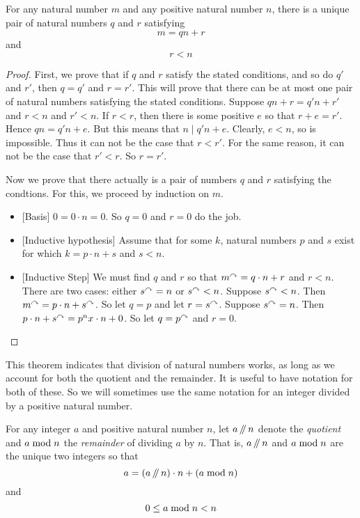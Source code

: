 \begin{thm}
	For any natural number $m$ and any positive natural number $n$, there is a unique pair of natural numbers $q$ and $r$ 
	satisfying
	\[m=qn + r\]
	and
	\[r < n\]
 
\begin{proof}
	First, we prove that if $q$ and $r$ satisfy the stated conditions, and so do $q'$ and $r'$, then $q=q'$ and $r=r'$.
	This will prove that there can be at most one pair of natural numbers satisfying the stated conditions.
	Suppose $qn+r = q'n+ r'$ and $r<n$ and $r'<n$. If $r<r$,
	then there is some positive $e$ so that $r+e=r'$. Hence $qn = q'n+e$. But this means that $n \mid q'n+e$. Clearly,
	$e<n$, so is
	impossible. Thus it can not be the case that $r<r'$. For the same reason, it can not be the case that $r'<r$. So $r=r'$. 
	
	Now we prove that there actually is a pair of numbers $q$ and $r$ satisfying the condtions. For this, we proceed by induction
	on $m$.
	\begin{itemize}
		\item{} [Basis] $0=0\cdot n = 0$. So $q=0$ and $r=0$ do the job.
		\item{} [Inductive hypothesis] Assume that for some $k$, natural numbers $p$ and $s$ exist for which $k=p\cdot n+s$ and $s<n$.
		\item{} [Inductive Step] We must find $q$ and $r$ so that $m^\curvearrowright = q\cdot n+r$ and $r<n$. There are two cases: either $s^\curvearrowright = n$
		or $s^\curvearrowright < n$.
		Suppose $s^\curvearrowright < n$. Then $m^\curvearrowright = p\cdot n + s^\curvearrowright$. So let $q=p$ and let $r=s^\curvearrowright$. Suppose $s^\curvearrowright = n$. Then $p\cdot n + s^\curvearrowright = p^nx\cdot n + 0$. So let $q=p^\curvearrowright$ and $r=0$.
	\end{itemize} 
\end{proof}
\end{thm}

This theorem indicates that division of natural numbers works, as long as we account for both the quotient and the remainder. It is useful to have notation for both of these.  So we will sometimes use the same notation for an integer divided by a positive natural number.

\begin{defn}
	For any integer $a$ and positive natural number $n$, let $a\mathop{/\mkern-5mu/} n$ denote the \emph{quotient} and $a\bmod n$ the \emph{remainder} of
	dividing $a$ by $n$. That is, $a\mathop{/\mkern-5mu/} n$ and $a\bmod n$ are the unique two integers so that
	\[a = (a\mathop{/\mkern-5mu/} n)\cdot n + (a\bmod n)\]
	and 
	\[0\leq a\bmod n < n\] 
\end{defn}

